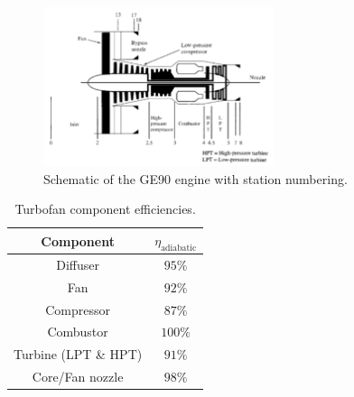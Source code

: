\documentclass[11pt]{article}
\begin{document}
\begin{figure}[!htb!]
	\centering
	\includegraphics[width=0.6\textwidth]{engine.pdf}
    \caption{Schematic of the GE90 engine with station numbering.}
	\label{fig:engine}
\end{figure}

\begin{table}[ht!]
	\caption{Turbofan component efficiencies.}
	\label{tab:eff}
	\centering
	\begin{tabular}{ | c | c |} 
			\hline
 		   	Component & $\eta_\text{adiabatic}$ \\\hline 
			\hline
			Diffuser & $95\%$ \\ 
			Fan & $92\%$ \\
			Compressor & $87\%$ \\
			Combustor & $100\%$ \\
			Turbine (LPT \& HPT) & $91\%$ \\
			Core/Fan nozzle & $98\%$ \\
			\hline
	\end{tabular}
\end{table}

\newpage
\end{document}
